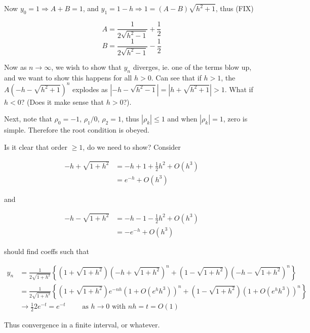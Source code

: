 \documentclass[a4paper]{article}
\begin{document}
Now $ y_{0} = 1 \Rightarrow A + B = 1 $, and $ y_{1} = 1 - h \Rightarrow 1 = (A-B) \sqrt{h^{2} + 1} $, thus (FIX)

\[ A = \frac{1}{2 \sqrt{h^{2} - 1}} + \frac{1}{2}  \]
\[ B = \frac{1}{2 \sqrt{h^{2} - 1}} - \frac{1}{2}  \]

Now as $ n \to \infty $, we wish to show that $ y_{n} $ diverges, ie. one of the terms blow up, and we want to show this happens for all $ h > 0 $. Can see that if $ h > 1 $, the $ A \left(   -h  - \sqrt{h^{2} + 1} \right)^{n} $ explodes as $ | -h  - \sqrt{h^{2} - 1} | = | h + \sqrt{h^{2} + 1} | > 1 $. What if $ h  < 0$? (Does it make sense that $ h > 0 $?).


Next, note that $ \rho_{0} = -1 $, $ \rho_{1} / 0 $, $ \rho_{2} = 1 $, thus $ | \rho_{k} | \leq 1 $ and when $ | \rho_{k} | = 1  $, zero is simple. Therefore the root condition is obeyed.

Is it clear that order $ \geq 1 $, do we need to show?
Consider 

\begin{align*}
- h +  \sqrt{1 + h^{2}} & = - h + 1 + \frac{1}{2} h^{2} + O(h^{3})  \\
& = e^{-h} + O(h^{3})
\end{align*}

and

\begin{align*}
- h -  \sqrt{1 + h^{2}} & = - h - 1 - \frac{1}{2} h^{2} + O(h^{3})  \\
& = -e^{-h} + O(h^{3})
\end{align*}

should find coeffs such that

\begin{align*}
y_{n} & = \frac{1}{2 \sqrt{1+h^{2}}}   \left\{   (1 + \sqrt{1+h^{2}})(-h + \sqrt{1 + h^{2}})^{n} + (1 - \sqrt{1+h^{2}})(-h - \sqrt{1 + h^{2}})^{n}  \right\}  \\
& = \frac{1}{2 \sqrt{1+h^{2}}}   \left\{   (1 + \sqrt{1+h^{2}}) e^{-nh}  (1 + O(e^{h}h^{3}))^{n} + (1 - \sqrt{1+h^{2}})(1 + O(e^{h}h^{3}))^{n} \right\}  \\
& \to \frac{1}{2} 2 e^{-t} = e^{-t} \qquad \text{ as } h \to 0 \text{ with } nh = t = O(1)
\end{align*}

Thus convergence in a finite interval, or whatever. 
\end{document}
